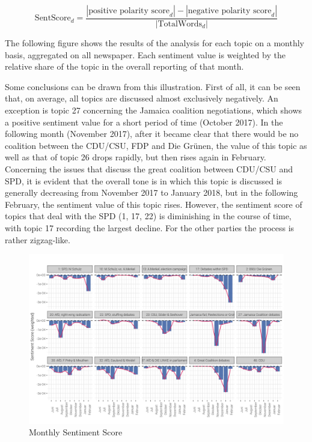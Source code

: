 \documentclass[12pt,a4paper,notitlepage]{article}
\begin{document}
\begin{equation}
	\text{SentScore}_d = \frac{|\text{positive polarity score}_d| - |\text{negative polarity score}_d|}{|\text{TotalWords}_d|}
\end{equation}

The following figure shows the results of the analysis for each topic on a monthly basis, aggregated on all newspaper. Each sentiment value is weighted by the relative share of the topic in the overall reporting of that month.

Some conclusions can be drawn from this illustration. First of all, it can be seen that, on average, all topics are discussed almost exclusively negatively. An exception is topic 27 concerning the Jamaica coalition negotiations, which shows a positive sentiment value for a short period of time (October 2017). In the following month (November 2017), after it became clear that there would be no coalition between the CDU/CSU, FDP and Die Grünen, the value of this topic as well as that of topic 26 drops rapidly, but then rises again in February. Concerning the issues that discuss the great coalition between CDU/CSU and SPD, it is evident that the overall tone is in which this topic is discussed is generally decreasing from November 2017 to January 2018, but in the following February, the sentiment value of this topic rises. However, the sentiment score of topics that deal with the SPD (1, 17, 22) is diminishing in the course of time, with topic 17 recording the largest decline. For the other parties the process is rather zigzag-like.

\begin{figure}[H]
	\caption{Monthly Sentiment Score}
		\begin{center}
			\includegraphics[width=\textwidth,keepaspectratio]{../figs/sentscore_monthly.png}
		\end{center}
	\label{fig_sentscore_monthly}
\end{figure}
\end{document}
